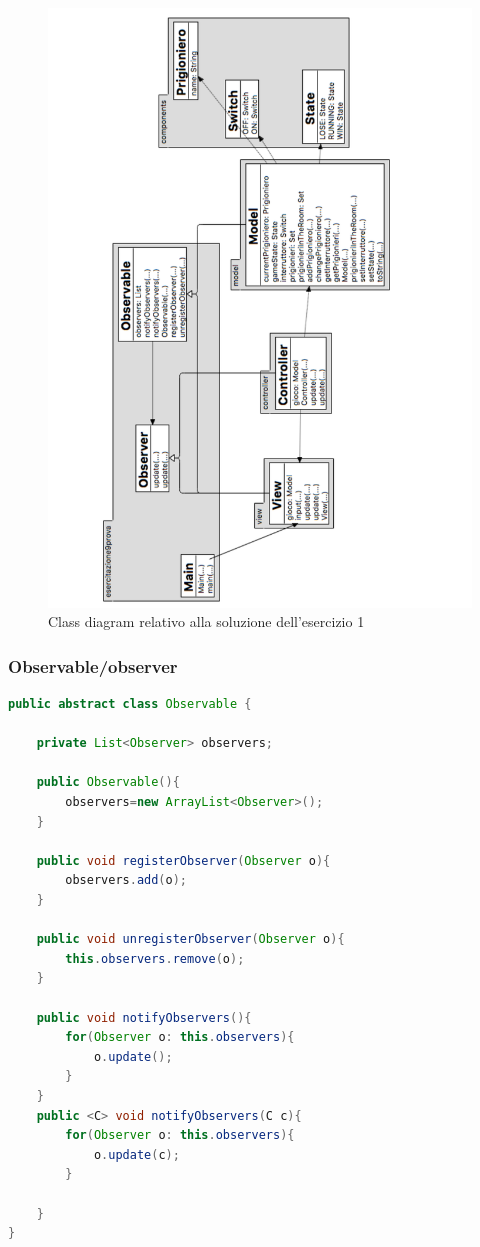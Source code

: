 \documentclass{article}
\begin{document}
\begin{figure}[h]
\centering
\includegraphics[width=1\textwidth]{Img/MVC.pdf}
\caption{Class diagram relativo alla soluzione dell'esercizio 1}
\label{Fig:MVCSol}
\end{figure}
\clearpage

\subsubsection{Observable/observer}
\begin{lstlisting}[language=Java]
public abstract class Observable {

	private List<Observer> observers;
	
	public Observable(){
		observers=new ArrayList<Observer>();
	}
	
	public void registerObserver(Observer o){
		observers.add(o);
	}
	
	public void unregisterObserver(Observer o){
		this.observers.remove(o);
	}
	
	public void notifyObservers(){
		for(Observer o: this.observers){
			o.update();
		}
	}
	public <C> void notifyObservers(C c){
		for(Observer o: this.observers){
			o.update(c);
		}
		
	}	
}

\end{lstlisting}
\end{document}
